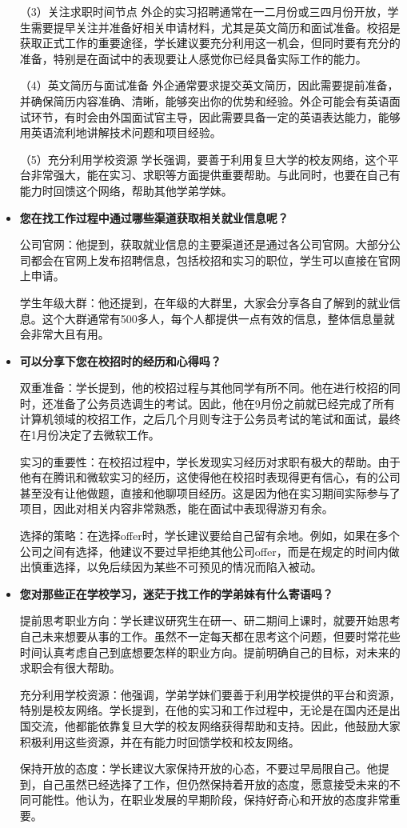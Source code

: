 \begin{itemize}
（3）关注求职时间节点
外企的实习招聘通常在一二月份或三四月份开放，学生需要提早关注并准备好相关申请材料，尤其是英文简历和面试准备。校招是获取正式工作的重要途径，学长建议要充分利用这一机会，但同时要有充分的准备，特别是在面试中的表现要让人感觉你已经具备实际工作的能力。

（4）英文简历与面试准备
外企通常要求提交英文简历，因此需要提前准备，并确保简历内容准确、清晰，能够突出你的优势和经验。外企可能会有英语面试环节，有时会由外国面试官主导，因此需要具备一定的英语表达能力，能够用英语流利地讲解技术问题和项目经验。

（5）充分利用学校资源
学长强调，要善于利用复旦大学的校友网络，这个平台非常强大，能在实习、求职等方面提供重要帮助。与此同时，也要在自己有能力时回馈这个网络，帮助其他学弟学妹。

    \item \textbf{您在找工作过程中通过哪些渠道获取相关就业信息呢？}

    公司官网：他提到，获取就业信息的主要渠道还是通过各公司官网。大部分公司都会在官网上发布招聘信息，包括校招和实习的职位，学生可以直接在官网上申请。
    
学生年级大群：他还提到，在年级的大群里，大家会分享各自了解到的就业信息。这个大群通常有500多人，每个人都提供一点有效的信息，整体信息量就会非常大且有用。

    \item \textbf{可以分享下您在校招时的经历和心得吗？}

    双重准备：学长提到，他的校招过程与其他同学有所不同。他在进行校招的同时，还准备了公务员选调生的考试。因此，他在9月份之前就已经完成了所有计算机领域的校招工作，之后几个月则专注于公务员考试的笔试和面试，最终在1月份决定了去微软工作。
    
实习的重要性：在校招过程中，学长发现实习经历对求职有极大的帮助。由于他有在腾讯和微软实习的经历，这使得他在校招时表现得更有信心，有的公司甚至没有让他做题，直接和他聊项目经历。这是因为他在实习期间实际参与了项目，因此对相关内容非常熟悉，能在面试中表现得游刃有余。

选择的策略：在选择offer时，学长建议要给自己留有余地。例如，如果在多个公司之间有选择，他建议不要过早拒绝其他公司offer，而是在规定的时间内做出慎重选择，以免后续因为某些不可预见的情况而陷入被动。

    \item \textbf{您对那些正在学校学习，迷茫于找工作的学弟妹有什么寄语吗？}

提前思考职业方向：学长建议研究生在研一、研二期间上课时，就要开始思考自己未来想要从事的工作。虽然不一定每天都在思考这个问题，但要时常花些时间认真考虑自己到底想要怎样的职业方向。提前明确自己的目标，对未来的求职会有很大帮助。
    
充分利用学校资源：他强调，学弟学妹们要善于利用学校提供的平台和资源，特别是校友网络。学长提到，在他的实习和工作过程中，无论是在国内还是出国交流，他都能依靠复旦大学的校友网络获得帮助和支持。因此，他鼓励大家积极利用这些资源，并在有能力时回馈学校和校友网络。

保持开放的态度：学长建议大家保持开放的心态，不要过早局限自己。他提到，自己虽然已经选择了工作，但仍然保持着开放的态度，愿意接受未来的不同可能性。他认为，在职业发展的早期阶段，保持好奇心和开放的态度非常重要。

\end{itemize}